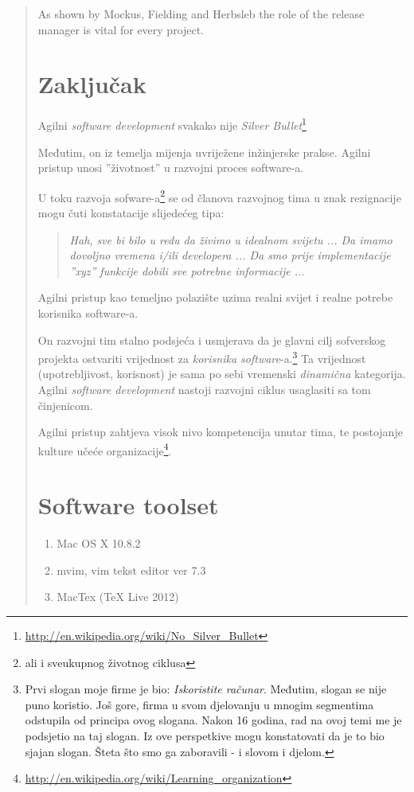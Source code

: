 \documentclass[lmodern, utf8, zavrsni]{fit}
\begin{document}
\begin{quote}
As shown by Mockus, Fielding and Herbsleb the role of the release manager is vital for every project.\citep[str. 95]{Siegel2012}


\chapter{Zaključak}

Agilni \emph{software development} svakako nije \emph{Silver Bullet}\footnote{\url{http://en.wikipedia.org/wiki/No_Silver_Bullet}}

Međutim, on iz temelja mijenja uvriježene inžinjerske prakse. Agilni pristup unosi ''životnost'' u razvojni proces software-a.

U toku razvoja sofware-a\footnote{ali i sveukupnog životnog ciklusa} se od članova razvojnog tima u znak rezignacije mogu čuti konstatacije slijedećeg tipa:
\begin{quotation}
  \emph{Hah, sve bi bilo u redu da živimo u idealnom svijetu ... Da imamo dovoljno vremena i/ili developera ... Da smo prije implementacije ''xyz'' funkcije dobili sve potrebne informacije ...}
\end{quotation}

Agilni pristup kao temeljno polazište uzima realni svijet i realne potrebe korisnika software-a.

On razvojni tim stalno podsjeća i usmjerava da je glavni cilj sofverskog projekta ostvariti vrijednost za \emph{korisnika software}-a.\footnote{Prvi slogan moje firme je bio: \emph{Iskoristite računar}. Međutim, slogan se nije puno koristio. Još gore, firma u svom djelovanju u mnogim segmentima odstupila od principa ovog slogana. Nakon 16 godina, rad na ovoj temi me je podsjetio na taj slogan. Iz ove perspetkive mogu konstatovati da je to bio sjajan slogan. Šteta što smo ga zaboravili - i slovom i djelom.}
Ta vrijednost (upotrebljivost, korisnost) je sama po sebi vremenski \emph{dinamična} kategorija. Agilni \emph{software development} nastoji razvojni ciklus usaglasiti sa tom činjenicom.

Agilni pristup zahtjeva visok nivo kompetencija unutar tima, te postojanje kulture učeće organizacije\footnote{\url{http://en.wikipedia.org/wiki/Learning_organization}}.





\appendix

\chapter{Software toolset}
\begin{enumerate}
  \item Mac OS X 10.8.2
  \item mvim, vim tekst editor ver 7.3
  \item MacTex (TeX Live 2012)
\end{enumerate}


\end{quote}
\end{document}
